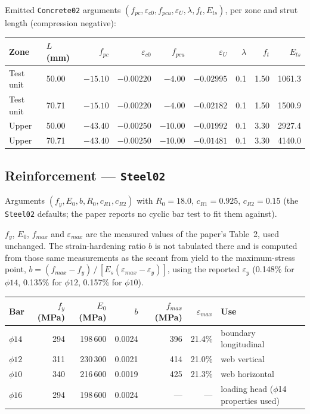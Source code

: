 \documentclass[11pt,a4paper]{article}
\begin{document}
Emitted \texttt{Concrete02} arguments $(f_{pc}, \varepsilon_{c0}, f_{pcu}, \varepsilon_U, \lambda,
f_t, E_{ts})$, per zone and strut length (compression negative):

\begin{center}\small
\begin{tabular}{@{}llrrrrrrr@{}}
\toprule
\textbf{Zone} & $L$ (mm) & $f_{pc}$ & $\varepsilon_{c0}$ & $f_{pcu}$ & $\varepsilon_U$ & $\lambda$ & $f_t$ & $E_{ts}$ \\
\midrule
Test unit & 50.00 & $-15.10$ & $-0.00220$ & $-4.00$  & $-0.02995$ & 0.1 & 1.50 & 1061.3 \\
Test unit & 70.71 & $-15.10$ & $-0.00220$ & $-4.00$  & $-0.02182$ & 0.1 & 1.50 & 1500.9 \\
Upper     & 50.00 & $-43.40$ & $-0.00250$ & $-10.00$ & $-0.01992$ & 0.1 & 3.30 & 2927.4 \\
Upper     & 70.71 & $-43.40$ & $-0.00250$ & $-10.00$ & $-0.01481$ & 0.1 & 3.30 & 4140.0 \\
\bottomrule
\end{tabular}\end{center}

\subsection{Reinforcement --- \texttt{Steel02}}

Arguments $(f_y, E_0, b, R_0, c_{R1}, c_{R2})$ with $R_0 = 18.0$, $c_{R1} = 0.925$,
$c_{R2} = 0.15$ (the \texttt{Steel02} defaults; the paper reports no cyclic bar test to fit them
against).

$f_y$, $E_0$, $f_{max}$ and $\varepsilon_{max}$ are the measured values of the paper's Table~2,
used unchanged. The strain-hardening ratio $b$ is not tabulated there and is computed from those
same measurements as the secant from yield to the maximum-stress point,
$b = (f_{max} - f_y)\,/\,[E_s(\varepsilon_{max} - \varepsilon_y)]$, using the reported
$\varepsilon_y$ (0.148\% for $\phi14$, 0.135\% for $\phi12$, 0.157\% for $\phi10$).

\begin{center}\small
\begin{tabular}{@{}lrrrrrl@{}}
\toprule
\textbf{Bar} & $f_y$ (MPa) & $E_0$ (MPa) & $b$ & $f_{max}$ (MPa) & $\varepsilon_{max}$ & \textbf{Use} \\
\midrule
$\phi14$ & 294 & 198\,600 & 0.0024 & 396 & 21.4\% & boundary longitudinal \\
$\phi12$ & 311 & 230\,300 & 0.0021 & 414 & 21.0\% & web vertical \\
$\phi10$ & 340 & 216\,600 & 0.0019 & 425 & 21.3\% & web horizontal \\
$\phi16$ & 294 & 198\,600 & 0.0024 & --- & --- & loading head ($\phi$14 properties used) \\
\bottomrule
\end{tabular}\end{center}
\end{document}
